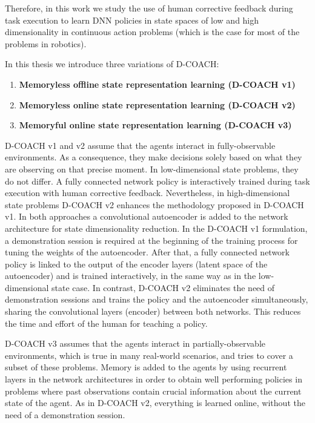 \begin{intro}
Therefore, in this work we study the use of human corrective feedback during task execution to learn DNN policies in state spaces of low and high dimensionality in continuous action problems (which is the case for most of the problems in robotics).

In this thesis we introduce three variations of D-COACH:

\begin{enumerate}
    \item \textbf{Memoryless offline state representation learning (D-COACH v1)}
    \item \textbf{Memoryless online state representation learning (D-COACH v2)}
    \item \textbf{Memoryful online state representation learning (D-COACH v3)}
\end{enumerate}

D-COACH v1 and v2 assume that the agents interact in fully-observable environments. As a consequence, they make decisions solely based on what they are observing on that precise moment. In low-dimensional state problems, they do not differ. A fully connected network policy is interactively trained during task execution with human corrective feedback. Nevertheless, in high-dimensional state problems D-COACH v2 enhances the methodology proposed in D-COACH v1. In both approaches a convolutional autoencoder is added to the network architecture for state dimensionality reduction. In the D-COACH v1 formulation, a demonstration session is required at the beginning of the training process for tuning the weights of the autoencoder. After that, a fully connected network policy is linked to the output of the encoder layers (latent space of the autoencoder) and is trained interactively, in the same way as in the low-dimensional state case. In contrast, D-COACH v2 eliminates the need of demonstration sessions and trains the policy and the autoencoder simultaneously, sharing the convolutional layers (encoder) between both networks. This reduces the time and effort of the human for teaching a policy.

D-COACH v3 assumes that the agents interact in partially-observable environments, which is true in many real-world scenarios, and tries to cover a subset of these problems. Memory is added to the agents by using recurrent layers in the network architectures in order to obtain well performing policies in problems where past observations contain crucial information about the current state of the agent. As in D-COACH v2, everything is learned online, without the need of a demonstration session. 


\end{intro}
